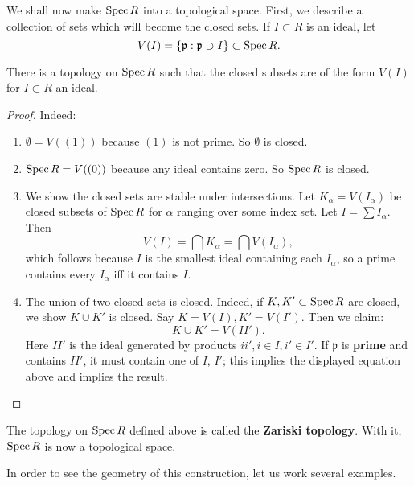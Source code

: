 We shall now make $\operatorname{Spec} R$ into a topological space. First, we describe a
collection of sets which will become the closed sets. 
If $I \subset R$ is an ideal, let
\[ V(I) = \left\{\mathfrak{p}: \mathfrak{p} \supset I\right\} \subset \operatorname{Spec} R.
\]

\begin{proposition} 
There is a topology on $\operatorname{Spec} R$ such that the closed subsets are of the form
$V(I)$ for $I \subset R$ an ideal.
\end{proposition} 

\begin{proof} 
Indeed:
\begin{enumerate}
\item $\emptyset = V((1))$ because $(1)$ is not prime. So $\emptyset$ is closed. 
\item $\operatorname{Spec} R = V((0))$ because any ideal contains zero. So $\operatorname{Spec} R$ is
closed.
\item  We show the closed sets are stable under intersections.  Let
$K_{\alpha} = V(I_{\alpha})$ be closed subsets of $\operatorname{Spec} R$ for $\alpha$
ranging over some index set.  Let $I
= \sum I_{\alpha}$. Then 
\[ V(I) = \bigcap K_{\alpha} = \bigcap V(I_{\alpha}),  \]
which follows because $I$ is the smallest ideal containing each $I_{\alpha}$,
so a prime contains every $I_{\alpha}$ iff it contains $I$.  
\item The union of two closed sets is closed. Indeed, if $K,K' \subset \operatorname{Spec}
R$ are closed, we show $K \cup K'$ is closed.  Say $K= V(I), K' = V(I')$. Then
we claim: 
\[ K \cup K'  = V(II').  \]
Here $II'$ is the ideal generated by products $ii', i \in I, i' \in I'$. If
$\mathfrak{p}$ is \textbf{prime} and contains $II'$, it must contain one of $I$, $I'$;
this implies the displayed equation above and implies the result.
\end{enumerate}
\end{proof} 
\begin{definition} 
The topology on $\operatorname{Spec} R$ defined above is called the \textbf{Zariski
topology}. With it,  $\operatorname{Spec} R$ is now a topological space.
\end{definition} 

In order to see the geometry of this construction, let us work several examples.

